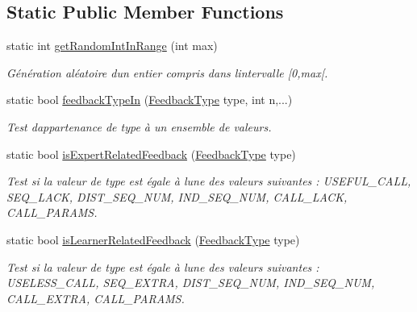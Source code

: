 \subsection*{Static Public Member Functions}
\begin{DoxyCompactItemize}
\item 
static int \hyperlink{class_traces_analyser_aefd7da818aa52292e7e9d4df9a7b2be0}{get\+Random\+Int\+In\+Range} (int max)
\begin{DoxyCompactList}\small\item\em Génération aléatoire d\textquotesingle{}un entier compris dans l\textquotesingle{}intervalle \mbox{[}0,max\mbox{[}. \end{DoxyCompactList}\item 
static bool \hyperlink{class_traces_analyser_aa2f744bc8abc8acfbb1407163c36c0b8}{feedback\+Type\+In} (\hyperlink{class_traces_analyser_a57be29ce5ac10ca51e56d8385b4a1820}{Feedback\+Type} type, int n,...)
\begin{DoxyCompactList}\small\item\em Test d\textquotesingle{}appartenance de {\ttfamily type} à un ensemble de valeurs. \end{DoxyCompactList}\item 
static bool \hyperlink{class_traces_analyser_a0ffe68d882d091ec904aa15ab795ec8a}{is\+Expert\+Related\+Feedback} (\hyperlink{class_traces_analyser_a57be29ce5ac10ca51e56d8385b4a1820}{Feedback\+Type} type)
\begin{DoxyCompactList}\small\item\em Test si la valeur de {\ttfamily type} est égale à l\textquotesingle{}une des valeurs suivantes \+: U\+S\+E\+F\+U\+L\+\_\+\+C\+A\+LL, S\+E\+Q\+\_\+\+L\+A\+CK, D\+I\+S\+T\+\_\+\+S\+E\+Q\+\_\+\+N\+UM, I\+N\+D\+\_\+\+S\+E\+Q\+\_\+\+N\+UM, C\+A\+L\+L\+\_\+\+L\+A\+CK, C\+A\+L\+L\+\_\+\+P\+A\+R\+A\+MS. \end{DoxyCompactList}\item 
static bool \hyperlink{class_traces_analyser_ab4bf5099acb58320a75f6540ba3730e2}{is\+Learner\+Related\+Feedback} (\hyperlink{class_traces_analyser_a57be29ce5ac10ca51e56d8385b4a1820}{Feedback\+Type} type)
\begin{DoxyCompactList}\small\item\em Test si la valeur de {\ttfamily type} est égale à l\textquotesingle{}une des valeurs suivantes \+: U\+S\+E\+L\+E\+S\+S\+\_\+\+C\+A\+LL, S\+E\+Q\+\_\+\+E\+X\+T\+RA, D\+I\+S\+T\+\_\+\+S\+E\+Q\+\_\+\+N\+UM, I\+N\+D\+\_\+\+S\+E\+Q\+\_\+\+N\+UM, C\+A\+L\+L\+\_\+\+E\+X\+T\+RA, C\+A\+L\+L\+\_\+\+P\+A\+R\+A\+MS. \end{DoxyCompactList}\end{DoxyCompactItemize}
